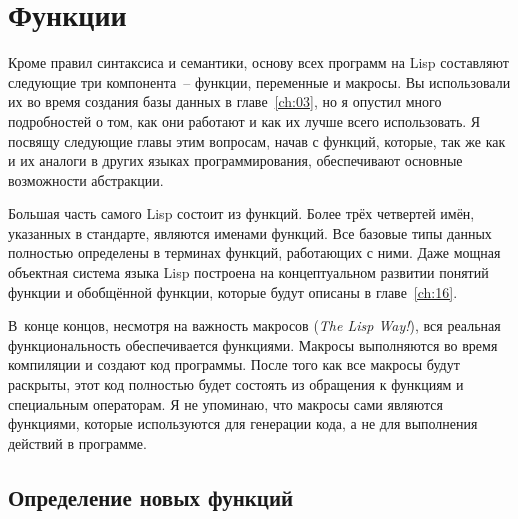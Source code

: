 \chapter{Функции}
\label{ch:05}

\thispagestyle{empty}

Кроме правил синтаксиса и семантики, основу всех программ на Lisp составляют следующие три
компонента~-- функции, переменные и макросы.  Вы использовали их во время создания базы
данных в главе~\ref{ch:03}, но я опустил много подробностей о том, как они работают и как
их лучше всего использовать.  Я посвящу следующие главы этим вопросам, начав с функций,
которые, так же как и их аналоги в других языках программирования, обеспечивают основные
возможности абстракции.

Большая часть самого Lisp состоит из функций.  Более трёх четвертей имён, указанных в
стандарте, являются именами функций.  Все базовые типы данных полностью определены в
терминах функций, работающих с ними. Даже мощная объектная система языка Lisp построена на
концептуальном развитии понятий функции и обобщённой функции, которые будут описаны в
главе~\ref{ch:16}.

В~конце концов, несмотря на важность макросов (\textit{The Lisp Way!}), вся реальная
функциональность обеспечивается функциями.  Макросы выполняются во время компиляции и
создают код программы. После того как все макросы будут раскрыты, этот код полностью будет
состоять из обращения к функциям и специальным операторам.  Я не упоминаю, что макросы
сами являются функциями, которые используются для генерации кода, а не для выполнения
действий в программе.

\section{Определение новых функций}

